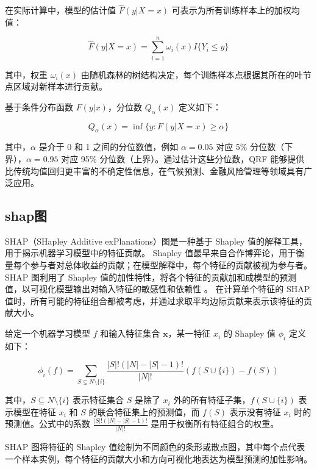 \documentclass[AutoFakeBold]{LZUThesis-PgD&PhD}
\begin{document}
	在实际计算中，模型的估计值 \( \hat{F}(y|X = x) \) 可表示为所有训练样本上的加权均值：
	
	\begin{equation}
		\hat{F}(y|X = x) = \sum_{i=1}^{n} \omega_i (x) I\{Y_i \leq y\}
	\end{equation}
	
	其中，权重 \( \omega_i (x) \) 由随机森林的树结构决定，每个训练样本点根据其所在的叶节点区域对新样本进行贡献。  
	
	基于条件分布函数 \( F(y|x) \)，分位数 \( Q_{\alpha}(x) \) 定义如下：
	
	\begin{equation}
		Q_{\alpha} (x) = \inf \{y : F(y|X = x) \geq \alpha \}
	\end{equation}
	
	其中，\( \alpha \) 是介于 0 和 1 之间的分位数值，例如 \( \alpha = 0.05 \) 对应 5\% 分位数（下界），\( \alpha = 0.95 \) 对应 95\% 分位数（上界）。通过估计这些分位数，QRF 能够提供比传统均值回归更丰富的不确定性信息，在气候预测、金融风险管理等领域具有广泛应用。
	
	\subsection{shap图}
	
	SHAP（SHapley Additive exPlanations）图是一种基于 Shapley 值的解释工具，用于揭示机器学习模型中的特征贡献。
	Shapley 值最早来自合作博弈论，用于衡量每个参与者对总体收益的贡献；在模型解释中，每个特征的贡献被视为参与者。
	SHAP 图利用了 Shapley 值的加性特性，将各个特征的贡献加和成模型的预测值，以可视化模型输出对输入特征的敏感性和依赖性 \cite{lundberg2017unified}。	
	在计算单个特征的 SHAP 值时，所有可能的特征组合都被考虑，并通过求取平均边际贡献来表示该特征的贡献大小。
	
	给定一个机器学习模型 \( f \) 和输入特征集合 \( \mathbf{x} \)，某一特征 \( x_i \) 的 Shapley 值 \( \phi_i \) 定义如下：
	
	\[
	\phi_i(f) = \sum_{S \subseteq N \setminus \{i\}} \frac{|S|! (|N| - |S| - 1)!}{|N|!} \left( f(S \cup \{i\}) - f(S) \right)
	\]
	
	其中，\( S \subseteq N \setminus \{i\} \) 表示特征集合 \( S \) 是除了 \( x_i \) 外的所有特征子集，\( f(S \cup \{i\}) \) 表示模型在特征 \( x_i \) 和 \( S \) 的联合特征集上的预测值，而 \( f(S) \) 表示没有特征 \( x_i \) 时的预测值。公式中的系数 \( \frac{|S|! (|N| - |S| - 1)!}{|N|!} \) 是用于权衡所有特征组合的权重。
	
	SHAP 图将特征的 Shapley 值绘制为不同颜色的条形或散点图，其中每个点代表一个样本实例，每个特征的贡献大小和方向可视化地表达为模型预测的加性影响。
	
\end{document}
